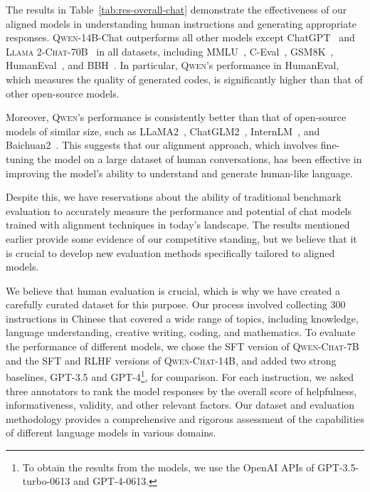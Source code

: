 The results in Table~\ref{tab:res-overall-chat} demonstrate the effectiveness of our aligned models in understanding human instructions and generating appropriate responses. \textsc{Qwen}-14B-Chat outperforms all other models except ChatGPT~\citep{chatgpt} and \textsc{Llama 2-Chat}\textsc{-70B}~\citep{llama2} in all datasets, including MMLU~\citep{mmlu}, C-Eval~\citep{ceval}, GSM8K~\citep{gsm8k}, HumanEval~\citep{codex}, and BBH~\citep{bbh}. In particular, \textsc{Qwen}'s performance in HumanEval, which measures the quality of generated codes, is significantly higher than that of other open-source models. 

Moreover, \textsc{Qwen}'s performance is consistently better than that of open-source models of similar size, such as LLaMA2~\citep{llama2}, ChatGLM2~\citep{chatglm2}, InternLM~\citep{internlm}, and Baichuan2~\citep{baichuan2}. This suggests that our alignment approach, which involves fine-tuning the model on a large dataset of human conversations, has been effective in improving the model's ability to understand and generate human-like language.

Despite this, we have reservations about the ability of traditional benchmark evaluation to accurately measure the performance and potential of chat models trained with alignment techniques in today's landscape. The results mentioned earlier provide some evidence of our competitive standing, but we believe that it is crucial to develop new evaluation methods specifically tailored to aligned models.

We believe that human evaluation is crucial, which is why we have created a carefully curated dataset for this purpose. Our process involved collecting \num{300} instructions in Chinese that covered a wide range of topics, including knowledge, language understanding, creative writing, coding, and mathematics. To evaluate the performance of different models, we chose the SFT version of \textsc{Qwen-Chat}-7B and the SFT and RLHF versions of \textsc{Qwen-Chat}-14B, and added two strong baselines, GPT-3.5 and GPT-4\footnote{To obtain the results from the models, we use the OpenAI APIs of GPT-3.5-turbo-0613 and GPT-4-0613.}, for comparison. For each instruction, we asked three annotators to rank the model responses by the overall score of helpfulness, informativeness, validity, and other relevant factors. Our dataset and evaluation methodology provides a comprehensive and rigorous assessment of the capabilities of different language models in various domains.

